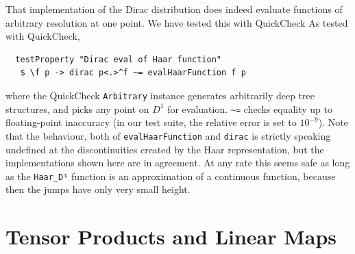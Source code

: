 \documentclass[sigplan,screen]{acmart}
\theoremstyle{acmplain}
\theoremstyle{acmdefinition}
\begin{document}
That implementation of the Dirac distribution does indeed evaluate functions of arbitrary resolution at one point. We have tested this with QuickCheck
As tested with QuickCheck,
\begin{lstlisting}
  testProperty "Dirac eval of Haar function"
   $ \f p -> dirac p<.>^f ~= evalHaarFunction f p
\end{lstlisting}
where the QuickCheck \lstinline`Arbitrary` instance generates arbitrarily deep tree structures, and picks any point on $D^1$ for evaluation.
\lstinline`~=` checks equality up to floating-point inaccuracy (in our test suite, the relative error  is set to $10^{-9}$).
Note that the behaviour, both of \verb`evalHaarFunction` and \verb`dirac` is strictly speaking undefined at the discontinuities created by the Haar representation, but the implementations shown here are in agreement. At any rate this seems safe as long as the \verb`Haar_D¹` function is an approximation of a continuous function, because then the jumps have only very small height.

\section{Tensor Products and Linear Maps}
\end{document}
